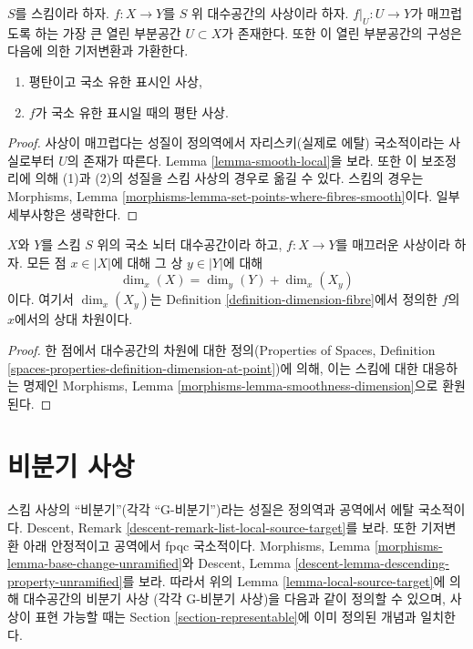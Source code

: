 \begin{lemma}
\label{lemma-where-smooth}
$S$를 스킴이라 하자. $f : X \to Y$를 $S$ 위 대수공간의 사상이라 하자.
$f|_U : U \to Y$가 매끄럽도록 하는 가장 큰 열린 부분공간
$U \subset X$가 존재한다. 또한 이 열린 부분공간의 구성은 다음에
의한 기저변환과 가환한다.
\begin{enumerate}
\item 평탄이고 국소 유한 표시인 사상,
\item $f$가 국소 유한 표시일 때의 평탄 사상.
\end{enumerate}
\end{lemma}

\begin{proof}
사상이 매끄럽다는 성질이 정의역에서 자리스키(실제로 에탈)
국소적이라는 사실로부터 $U$의 존재가 따른다. Lemma
\ref{lemma-smooth-local}을 보라. 또한 이 보조정리에 의해 (1)과
(2)의 성질을 스킴 사상의 경우로 옮길 수 있다. 스킴의 경우는
Morphisms, Lemma \ref{morphisms-lemma-set-points-where-fibres-smooth}이다.
일부 세부사항은 생략한다.
\end{proof}

\begin{lemma}
\label{lemma-smoothness-dimension-spaces}
$X$와 $Y$를 스킴 $S$ 위의 국소 뇌터 대수공간이라 하고,
$f : X \to Y$를 매끄러운 사상이라 하자. 모든 점 $x \in |X|$에 대해
그 상 $y \in |Y|$에 대해
$$
\dim_x(X) = \dim_y(Y) + \dim_x(X_y)
$$
이다. 여기서 $\dim_x(X_y)$는 Definition
\ref{definition-dimension-fibre}에서 정의한 $f$의 $x$에서의 상대
차원이다.
\end{lemma}

\begin{proof}
한 점에서 대수공간의 차원에 대한 정의(Properties of Spaces,
Definition \ref{spaces-properties-definition-dimension-at-point})에 의해,
이는 스킴에 대한 대응하는 명제인 Morphisms, Lemma
\ref{morphisms-lemma-smoothness-dimension}으로 환원된다.
\end{proof}






\section{비분기 사상}
\label{section-unramified}

\noindent
스킴 사상의 “비분기”(각각 “G-비분기”)라는 성질은 정의역과 공역에서
에탈 국소적이다. Descent, Remark \ref{descent-remark-list-local-source-target}를
보라. 또한 기저변환 아래 안정적이고 공역에서 fpqc 국소적이다. Morphisms,
Lemma \ref{morphisms-lemma-base-change-unramified}와 Descent, Lemma
\ref{descent-lemma-descending-property-unramified}를 보라. 따라서 위의
Lemma \ref{lemma-local-source-target}에 의해 대수공간의 비분기 사상
(각각 G-비분기 사상)을 다음과 같이 정의할 수 있으며, 사상이 표현 가능할
때는 Section \ref{section-representable}에 이미 정의된 개념과 일치한다.

